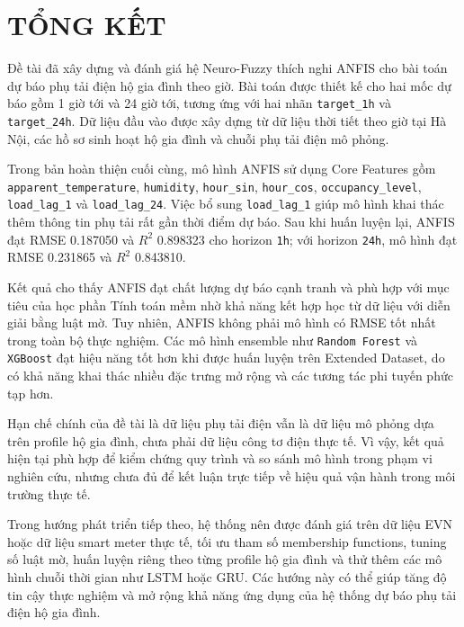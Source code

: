 \chapter*{TỔNG KẾT}

Đề tài đã xây dựng và đánh giá hệ Neuro-Fuzzy thích nghi ANFIS cho bài toán dự báo phụ tải điện hộ gia đình theo giờ. Bài toán được thiết kế cho hai mốc dự báo gồm 1 giờ tới và 24 giờ tới, tương ứng với hai nhãn \texttt{target\_1h} và \texttt{target\_24h}. Dữ liệu đầu vào được xây dựng từ dữ liệu thời tiết theo giờ tại Hà Nội, các hồ sơ sinh hoạt hộ gia đình và chuỗi phụ tải điện mô phỏng.

Trong bản hoàn thiện cuối cùng, mô hình ANFIS sử dụng Core Features gồm \texttt{apparent\_temperature}, \texttt{humidity}, \texttt{hour\_sin}, \texttt{hour\_cos}, \texttt{occupancy\_level}, \texttt{load\_lag\_1} và \texttt{load\_lag\_24}. Việc bổ sung \texttt{load\_lag\_1} giúp mô hình khai thác thêm thông tin phụ tải rất gần thời điểm dự báo. Sau khi huấn luyện lại, ANFIS đạt RMSE 0.187050 và $R^2$ 0.898323 cho horizon \texttt{1h}; với horizon \texttt{24h}, mô hình đạt RMSE 0.231865 và $R^2$ 0.843810.

Kết quả cho thấy ANFIS đạt chất lượng dự báo cạnh tranh và phù hợp với mục tiêu của học phần Tính toán mềm nhờ khả năng kết hợp học từ dữ liệu với diễn giải bằng luật mờ. Tuy nhiên, ANFIS không phải mô hình có RMSE tốt nhất trong toàn bộ thực nghiệm. Các mô hình ensemble như \texttt{Random Forest} và \texttt{XGBoost} đạt hiệu năng tốt hơn khi được huấn luyện trên Extended Dataset, do có khả năng khai thác nhiều đặc trưng mở rộng và các tương tác phi tuyến phức tạp hơn.

Hạn chế chính của đề tài là dữ liệu phụ tải điện vẫn là dữ liệu mô phỏng dựa trên profile hộ gia đình, chưa phải dữ liệu công tơ điện thực tế. Vì vậy, kết quả hiện tại phù hợp để kiểm chứng quy trình và so sánh mô hình trong phạm vi nghiên cứu, nhưng chưa đủ để kết luận trực tiếp về hiệu quả vận hành trong môi trường thực tế.

Trong hướng phát triển tiếp theo, hệ thống nên được đánh giá trên dữ liệu EVN hoặc dữ liệu smart meter thực tế, tối ưu tham số membership functions, tuning số luật mờ, huấn luyện riêng theo từng profile hộ gia đình và thử thêm các mô hình chuỗi thời gian như LSTM hoặc GRU. Các hướng này có thể giúp tăng độ tin cậy thực nghiệm và mở rộng khả năng ứng dụng của hệ thống dự báo phụ tải điện hộ gia đình.
